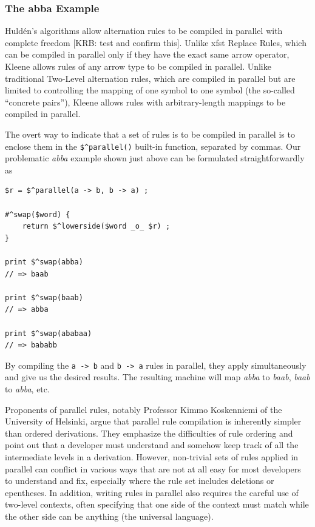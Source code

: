 \subsubsection{The abba Example}

Huld\'en's algorithms allow alternation rules to be compiled in parallel with complete freedom [KRB:  test and confirm
this].  Unlike xfst Replace Rules, which can be compiled in parallel only if they have the exact same arrow operator,
Kleene allows rules of any arrow type to be compiled in parallel.  Unlike traditional Two-Level alternation rules, which are
compiled in parallel but are
limited to controlling the mapping of one symbol to one symbol (the so-called ``concrete pairs''), Kleene allows
rules with arbitrary-length mappings to be compiled in parallel.

The overt way to indicate that a set of rules is to be compiled in parallel is to enclose them in the \verb!$^parallel()!
built-in function, separated by commas.  Our problematic \emph{abba} example shown just above
can be formulated straightforwardly as

\begin{Verbatim}
$r = $^parallel(a -> b, b -> a) ;

#^swap($word) {
    return $^lowerside($word _o_ $r) ;
}

print $^swap(abba)
// => baab

print $^swap(baab)
// => abba

print $^swap(ababaa)
// => bababb
\end{Verbatim}

\noindent
By compiling the \texttt{a -> b} and \texttt{b -> a} rules in parallel, they apply simultaneously and give us the desired
results.
The resulting machine will map \emph{abba} to \emph{baab}, \emph{baab} to \emph{abba},
etc. 


Proponents of parallel rules, notably Professor Kimmo Koskenniemi of the University of
Helsinki, argue that parallel rule compilation is inherently simpler than ordered
derivations.  They emphasize the difficulties of rule ordering and point out that a
developer must understand and somehow keep track of all the intermediate levels in a
derivation.  However, non-trivial sets of rules applied in parallel can conflict in
various ways that are not at all easy for most developers to understand and fix,
especially where the rule set includes deletions or epentheses.  In addition,
writing rules in parallel
also requires the careful use of two-level contexts, often specifying that one side
of the context must match while the other side can be anything (the universal language).


